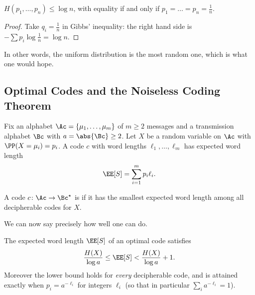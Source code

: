 \begin{corollary}
	$H(p_1, \dots, p_n) \le \log n$, with equality if and only if $p_1 = \dots = p_n = \frac1n$.
\end{corollary}

\begin{proof}
	Take $q_i = \frac1n$ in Gibbs' inequality: the right hand side is $-\sum p_i \log \frac1n = \log n$.
\end{proof}

In other words, the uniform distribution is the most random one, which is what one would hope.

\subsection{Optimal Codes and the Noiseless Coding Theorem}

Fix an alphabet $\Ac = \{\mu_1, \dots, \mu_m\}$ of $m \ge 2$ messages and a transmission alphabet $\Bc$ with $a = \abs{\Bc} \ge 2$. Let $X$ be a random variable on $\Ac$ with $\PP(X = \mu_i) = p_i$. A code $c$ with word lengths $\ell_1, \dots, \ell_m$ has expected word length
$$\EE[S] = \sum_{i=1}^m p_i \ell_i.$$

\begin{definition}
	A code $c \colon \Ac \to \Bc^\star$ is  if it has the smallest expected word length among all decipherable codes for $X$.
\end{definition}

We can now say precisely how well one can do.

\begin{theorem}\label{thm:noiseless}
	The expected word length $\EE[S]$ of an optimal code satisfies
	$$\frac{H(X)}{\log a} \le \EE[S] < \frac{H(X)}{\log a} + 1.$$
	Moreover the lower bound holds for \emph{every} decipherable code, and is attained exactly when $p_i = a^{-\ell_i}$ for integers $\ell_i$ (so that in particular $\sum_i a^{-\ell_i} = 1$).
\end{theorem}

